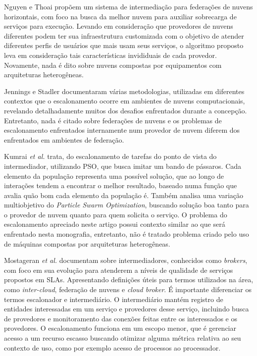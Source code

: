 Nguyen e Thoai \cite{7791859} propõem um sistema de intermediação para federações de nuvens horizontais, com foco na busca da melhor nuvem para auxiliar sobrecarga de serviços para execução. Levando em consideração que provedores de nuvens diferentes podem ter sua infraestrutura customizada com o objetivo de atender diferentes perfis de usuários que mais usam seus serviços, o algoritmo proposto leva em consideração tais características invididuais de cada provedor. Novamente, nada é dito sobre nuvens compostas por equipamentos com arquiteturas heterogêneas.

Jennings e Stadler \cite{Jennings:2015:RMC:2793474.2793493} documentaram  várias metodologias, utilizadas em diferentes contextos que o escalonamento ocorre em ambientes de nuvens computacionais, revelando detalhadamente muitos dos desafios enfrentados durante a concepção. Entretanto, nada é citado sobre federações de nuvens e os problemas de escalonamento enfrentados internamente num provedor de nuvem diferem dos enfrentados em ambientes de federação.

Kumrai \textit{et al.} \cite{7467407} trata, do escalonamento de tarefas do ponto de vista do intermediador, utilizando \acrfull{PSO}, que busca imitar um bando de pássaros. Cada elemento da população representa uma possível solução, que ao longo de interações tendem a encontrar o melhor resultado, baseado numa função que avalia quão bom cada elemento da população é. Também analisa uma variação multiobjetivo do \textit{Particle Swarm Optimization}, buscando solução boa tanto para o provedor de nuvem quanto para quem solicita o serviço. O problema do escalonamento apreciado neste artigo possui contexto similar ao que será enfrentado nesta monografia, entretanto, não é tratado problema criado pelo uso de máquinas compostas por arquiteturas heterogêneas.

Mostageran \textit{et al.} \cite{7224588} documentam sobre intermediadores, conhecidos como \textit{brokers}, com foco em sua evolução para atenderem a níveis de qualidade de serviços propostos em \acrshort{SLA}s. Apresentando definições úteis para termos utilizados na área, como \textit{inter-cloud}, federação de nuvens e \textit{cloud broker}. É importante diferenciar os termos escalonador e intermediário. O intermediário mantém registro de entidades interessadas em um serviço e provedores desse serviço, incluindo busca de provedores e monitoramento das conexões feitas entre os interessados e os provedores. O escalonamento funciona em um escopo menor, que é gerenciar acesso a um recurso escasso buscando otimizar alguma métrica relativa ao seu contexto de uso, como por exemplo acesso de processos ao processador.

